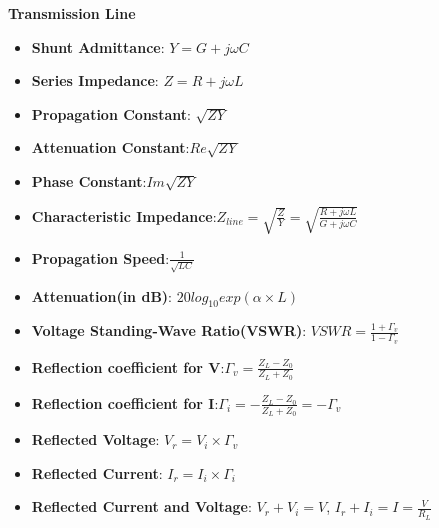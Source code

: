 \documentclass{article}
\begin{document}
  \textbf{Transmission Line}
  \begin{itemize}
  \item \textbf{Shunt Admittance}: $Y = G + j\omega C$
  \item \textbf{Series Impedance}: $Z = R + j \omega L$
  \item \textbf{Propagation Constant}: $ \sqrt{ZY}$
  \item \textbf{Attenuation Constant}:$ Re\sqrt{ZY}$
  \item \textbf{Phase Constant}:$Im\sqrt{ZY} $
  \item \textbf{Characteristic Impedance}:$Z_{line} = \sqrt{\frac{Z}{Y}} = \sqrt{\frac{R + j\omega L}{G + j\omega C}}$
  \item \textbf{Propagation Speed}:$\frac{1}{\sqrt{LC}}$
  \item \textbf{Attenuation(in dB)}: $20log_{10}exp(\alpha \times L)$
  \item \textbf{Voltage Standing-Wave Ratio(VSWR)}: $VSWR = \frac{1+\Gamma_v}{1-\Gamma_v}$
  \item \textbf{Reflection coefficient for V}:$\Gamma_v = \frac{Z_L - Z_0}{Z_L+Z_0}$
  \item \textbf{Reflection coefficient for I}:$\Gamma_i = -\frac{Z_L - Z_0}{Z_L+Z_0} = -\Gamma_v$
  
  \item \textbf{Reflected Voltage}: $V_r = V_i \times \Gamma_v$
  \item \textbf{Reflected Current}: $I_r = I_i \times \Gamma_i$
  \item \textbf{Reflected Current and Voltage}: $V_r + V_i = V$, $I_r + I_i = I = \frac{V}{R_L}$
  \end{itemize}
  
  
\end{document}
